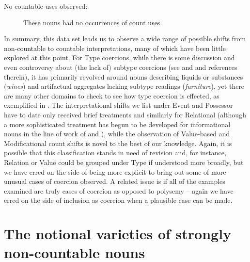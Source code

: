 \documentclass[output=paper]{langscibook}
\begin{document}
\begin{description}
\item[No countable uses observed:]  These nouns had no occurrences of count uses. 

\end{description}



In summary, this data set leads us to observe a wide range of possible shifts  from non-countable to countable interpretations, many of which have been little explored at this point.  %
For Type coercions, while there is some discussion and even controversy about (the lack of) subtype coercions (see \citealt{grimm2016artifact} and \citealt{sutton2016counting} and references therein), it has primarily revolved around nouns describing liquids or substances (\textit{wines}) and artifactual aggregates lacking subtype readings (\textit{furniture}), yet there are many other domains to check to see how type coercion is effected, as exemplified  in .   The interpretational shifts we list under Event and Possessor have to date only received brief treatments \citep{grimm2014individuating, ZamparelliToAppear, Husic2020} and similarly for Relational \citep{grimm2014individuating} (although a more sophisticated treatment has begun to be developed for informational nouns in the line of work of \citealt{sutton2019singular} and \citealt{Sutton_Filip_2020}), while the observation of Value-based and Modificational count shifts is novel to the best of our knowledge.  Again, it is possible that this classification stands in need of revision and, for instance, Relation or Value could be grouped under Type if understood more broadly, but we have erred on the side of being more explicit to bring out some of more unusual cases of coercion observed.  A related issue is if all of the examples examined are truly cases of coercion as opposed to polysemy -- again we have erred on the side of inclusion as coercion when a plausible case can be made.

\section{The notional varieties of strongly non-countable nouns}\label{gri-ric:sec:notional}  
\end{document}
